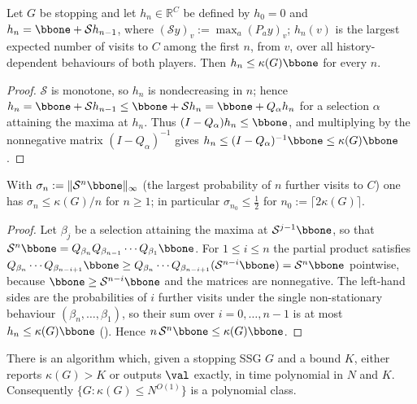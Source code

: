 \begin{lemma}\label{ht:lem-nonstat}
Let $G$ be stopping and let $h_n\in\mathbb R^{C}$ be defined by $h_0=0$ and
$h_{n}=\bbone+\mathcal S h_{n-1}$, where $(\mathcal S y)_v:=\max_a(P_ay)_v$;
$h_n(v)$ is the largest expected number of visits to $C$ among the first
$n$, from $v$, over all history-dependent behaviours of both players. Then
$h_n\le\kappa(G)\bbone$ for every $n$.
\end{lemma}

\begin{proof}
$\mathcal S$ is monotone, so $h_n$ is nondecreasing in $n$; hence
$h_n=\bbone+\mathcal Sh_{n-1}\le\bbone+\mathcal Sh_n=\bbone+Q_\alpha h_n$ for
a selection $\alpha$ attaining the maxima at $h_n$. Thus
$(I-Q_\alpha)h_n\le\bbone$, and multiplying by the nonnegative matrix
$(I-Q_\alpha)^{-1}$ gives $h_n\le(I-Q_\alpha)^{-1}\bbone\le\kappa(G)\bbone$.
\end{proof}

\begin{lemma}\label{ht:lem-sigma}
With $\sigma_n:=\|\mathcal S^n\bbone\|_\infty$ (the largest probability of
$n$ further visits to $C$) one has $\sigma_n\le\kappa(G)/n$ for $n\ge1$;
in particular $\sigma_{n_0}\le\tfrac12$ for $n_0:=\lceil2\kappa(G)\rceil$.
\end{lemma}

\begin{proof}
Let $\beta_j$ be a selection attaining the maxima at $\mathcal S^{j-1}\bbone$,
so that $\mathcal S^{n}\bbone=Q_{\beta_n}Q_{\beta_{n-1}}\cdots Q_{\beta_1}\bbone$.
For $1\le i\le n$ the partial product satisfies
$Q_{\beta_n}\cdots Q_{\beta_{n-i+1}}\bbone\ge Q_{\beta_n}\cdots Q_{\beta_{n-i+1}}(\mathcal S^{n-i}\bbone)=\mathcal S^{n}\bbone$
pointwise, because $\bbone\ge\mathcal S^{n-i}\bbone$ and the matrices are
nonnegative. The left-hand sides are the probabilities of $i$ further visits
under the single non-stationary behaviour $(\beta_n,\dots,\beta_1)$, so their
sum over $i=0,\dots,n-1$ is at most $h_n\le\kappa(G)\bbone$
(). Hence $n\,\mathcal S^n\bbone\le\kappa(G)\bbone$.
\end{proof}

\begin{theorem}\label{ht:thm-kappa}
There is an algorithm which, given a stopping SSG $G$ and a bound $K$, either
reports $\kappa(G)>K$ or outputs $\val$ exactly, in time polynomial in $N$ and
$K$. Consequently $\{G:\kappa(G)\le N^{O(1)}\}$ is a polynomial class.
\end{theorem}

